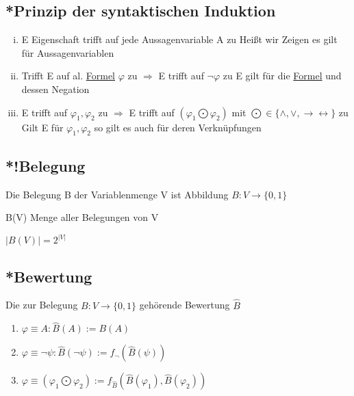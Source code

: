 \documentclass[12pt,a4paper]{article} %
\begin{document}
	\subsection{*Prinzip der syntaktischen Induktion}
	\begin{enumerate}[(i)]
		\item E Eigenschaft trifft auf jede Aussagenvariable A zu \newline
		Heißt wir Zeigen es gilt für Aussagenvariablen
		\item Trifft E auf al. \hyperref[Formel]{Formel} $\varphi$ zu $\Rightarrow$ E trifft auf $\neg \varphi$ zu \newline 
		E gilt für die \hyperref[Formel]{Formel} und dessen Negation
		\item E trifft auf $\varphi_1, \varphi_2$ zu $\Rightarrow$ E trifft auf $(\varphi_1 \bigodot \varphi_2)$ mit $\bigodot \in \{\land, \lor, \rightarrow\leftrightarrow\}$ zu \newline 
		Gilt E für $\varphi_1, \varphi_2$ so gilt es auch für deren Verknüpfungen
	\end{enumerate}
	
	\subsection{*!Belegung}
	\label{Belegung}
	Die Belegung B der Variablenmenge V ist Abbildung $B: V \rightarrow \{0, 1\}$
	
	B(V) Menge aller Belegungen von V
	
	$|B(V)| = 2^{|V|}$
	
	\subsection{*Bewertung}
	Die zur Belegung $B: V \rightarrow \{0, 1\}$ gehörende Bewertung $\widehat{B}$ 
	
	\begin{enumerate}
		\item $\varphi \equiv A : \widehat{B}(A) := B(A)$
		\item $\varphi \equiv \neg \psi : \widehat{B}(\neg \psi) := f_{\neg}(\widehat{B}(\psi))$
		\item $\varphi \equiv (\varphi_1 \bigodot \varphi_2) := f_{\widehat{B}}(\widehat{B}(\varphi_1), \widehat{B}(\varphi_2))$
	\end{enumerate}
	
\end{document}

